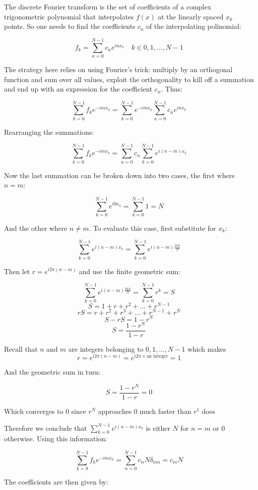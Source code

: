 \documentclass[titlepage]{article}
\begin{document}
The discrete Fourier transform is the set of coefficients of a complex trigonometric polynomial that interpolates $f(x)$ at the linearly spaced $x_k$ points. 
So one needs to find the coefficients $c_n$ of the interpolating polinomial:

$$f_k = \sum_{n=0}^{N-1} c_ne^{i n x_k}\quad k \in {0,1,\dots,N-1}$$

The strategy here relies on using Fourier's trick: multiply by an orthogonal  function and sum over all values, exploit the orthogonality to kill off a summation and end up with an expression for the coefficient $c_n$. Thus:

$$\sum_{k=0}^{N-1} f_ke^{-i m x_k} = \sum_{k=0}^{N-1} e^{-i m x_k}\sum_{n=0}^{N-1} c_ne^{i n x_k}$$

Rearranging the summations:

$$\sum_{k=0}^{N-1} f_ke^{-i m x_k} = \sum_{n=0}^{N-1} c_n\sum_{k=0}^{N-1}  e^{i (n-m) x_k}$$

Now the last summation can be broken down into two cases, the first where $n = m$:

$$\sum_{k=0}^{N-1} e^{i 0 x_k} = \sum_{k=0}^{N-1} 1 = N$$

And the other where $n\neq m$. To evaluate this case, first substitute for $x_k$:

$$\sum_{k=0}^{N-1}  e^{i (n-m) x_k} = \sum_{k=0}^{N-1}  e^{i (n-m) \frac{2\pi k}{N}} $$

Then let $r = e^{i 2\pi (n-m)}$ and use the finite geometric sum:

$$\sum_{k=0}^{N-1}  e^{i (n-m) \frac{2\pi k}{N}} = \sum_{k=0}^{N-1}r^k  = S$$
$$S = 1 + r + r^2+\dots+r^{N-1} $$
$$rS = r + r^2+r^3+\dots+r^{N-1}+r^{N} $$
$$S-rS = 1-r^{N}$$
$$S = \frac{1-r^{N}}{1-r}$$

Recall that $n$ and $m$ are integers belonging to ${0,1,\dots,N-1}$ which makes 
$$r = e^{i 2\pi (n-m)} = e^{i 2\pi\times\mbox{an integer}}  = 1$$

And the geometric sum in turn:

$$S = \frac{1-r^{N}}{1-r} = 0$$

Which converges to 0 since $r^N$ approaches 0 much faster than $r^1$ does

Therefore we conclude that $\sum_{k=0}^{N-1}  e^{i (n-m) x_k}$ is either $N$ for $n=m$ or $0$ otherwise. Using this information:

$$\sum_{k=0}^{N-1} f_ke^{-i m x_k} = \sum_{n=0}^{N-1} c_nN\delta_{nm} = c_mN$$

The coefficients are then given by:
\end{document}
